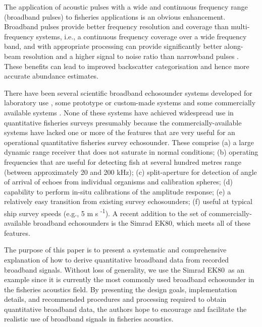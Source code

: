 \documentclass[preprint,12pt,TurnOnLineNumbers]{JASAnew}
\newcommand{\ek}{Simrad EK80}
\begin{document}
The application of acoustic pulses with a wide and continuous frequency range (broadband pulses) to fisheries applications is an obvious enhancement. Broadband pulses provide better frequency resolution and coverage than multi-frequency systems, i.e., a continuous frequency coverage over a wide frequency band, and with appropriate processing can provide significantly better along-beam resolution and a higher signal to noise ratio than narrowband pulses \citep{Chu1998Application, ehrenbergFMSlideChirp2000}. These benefits can lead to improved backscatter categorisation \citep{Traykovski1998Effect, Stanton2012Resonance, Korneliussen2016Acoustic, korneliussen2018} and hence more accurate abundance estimates.

There have been several scientific broadband echosounder systems developed for laboratory use \citep{Conti2003Wide-bandwidth, Forland2014Scattering, chu1992}, some prototype or custom-made systems \citep{Zakharia1989Wide-band, Zakharia1996Wideband, Simmonds1996Species, Foote2005Measuring, Imaizumi2009Detection, Briseno-Avena2015ZOOPS, Barr2002Target} and some commercially available systems \citep{Gordon1998FishMASS, Zedel2003Acoustic, Stanton2010New, ehrenbergFMSlideChirp2000, dennyBroadbandAcousticFish1998}. None of these systems have achieved widespread use in quantitative fisheries surveys presumably because the commercially-available systems have lacked one or more of the features that are very useful for an operational quantitative fisheries survey echosounder. These comprise (a) a large dynamic range receiver that does not saturate in normal conditions; (b) operating frequencies that are useful for detecting fish at several hundred metres range (between approximately 20 and 200 kHz); (c) split-aperture for detection of angle of arrival of echoes from individual organisms and calibration spheres; (d) capability to perform in-situ calibrations of the amplitude response; (e) a relatively easy transition from existing survey echosounders; (f) useful at typical ship survey speeds (e.g., 5 m s \textsuperscript{-1}). A recent addition to the set of commercially-available broadband echosounders is the Simrad EK80, which meets all of these features.

The purpose of this paper is to present a systematic and comprehensive explanation of how to derive quantitative broadband data from recorded broadband signals. Without loss of generality, we use the \ek\ as an example since it is currently the most commonly used broadband echosounder in the fisheries acoustics field. By presenting the design goals, implementation details, and recommended procedures and processing required to obtain quantitative broadband data, the authors hope to encourage and facilitate the realistic use of broadband signals in fisheries acoustics.
\end{document}
